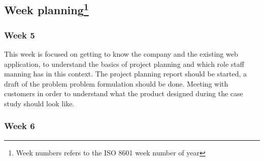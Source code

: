 

\subsection{Week planning\footnote{Week numbers refers to the ISO 8601 week number of year}}

\subsubsection{Week 5}

This week is focused on getting to know the company and the existing web
application, to understand the basics of project planning and which role
staff manning has in this context. The project planning report should be
started, a draft of the problem problem formulation should be done.
Meeting with customers in order to understand what the product designed
during the case study should look like.


\subsubsection{Week 6}

